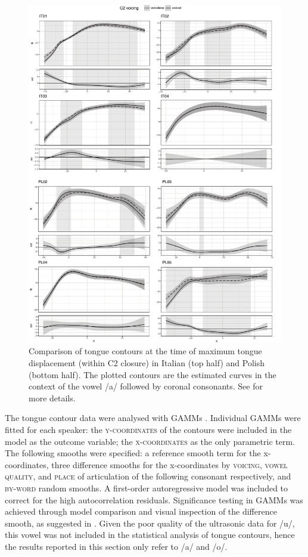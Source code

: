 \documentclass[authoryear, twocolumn]{elsarticle}
\begin{document}
\begin{figure}
    \centering
    \includegraphics[height=.9\textheight]{fig/tra.pdf}
    \caption{Comparison of tongue contours at the time of maximum tongue displacement (within C2 closure) in Italian (top half) and Polish (bottom half). The plotted contours are the estimated curves in the context of the vowel /a/ followed by coronal consonants. See  for more details.}
    \label{f:tra}
\end{figure}

The tongue contour data were analysed with GAMMs \citep{wood2006}.
Individual GAMMs were fitted for each speaker: the
\textsc{y-coordinates} of the contours were included in the model as the
outcome variable; the \textsc{x-coordinates} as the only parametric
term. The following smooths were specified: a reference smooth term for
the x-coordinates, three difference smooths for the x-coordinates by
\textsc{voicing}, \textsc{vowel quality}, and \textsc{place} of
articulation of the following consonant respectively, and
\textsc{by-word} random smooths. A first-order autoregressive model was
included to correct for the high autocorrelation residuals. Significance
testing in GAMMs was achieved through model comparison and visual
inspection of the difference smooth, as suggested in
\citep{soskuthy2017}. Given the poor quality of the ultrasonic data for
/u/, this vowel was not included in the statistical analysis of tongue
contours, hence the results reported in this section only refer to /a/
and /o/.
\end{document}
